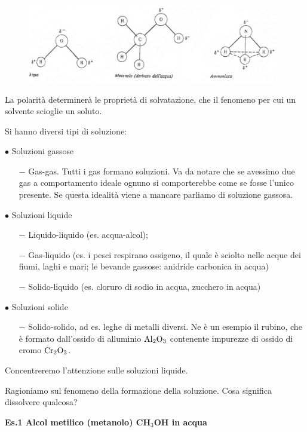 \begin{figure}[htp]
    \centering
    \includegraphics[width=11cm]{immagini/molecole_polari}
\end{figure}

La polarità determinerà le proprietà di solvatazione, che il fenomeno per cui un solvente scioglie un soluto.

\vspace{0.2cm}Si hanno diversi tipi di soluzione:

\vspace{0.2cm}$\bullet$ Soluzioni gassose
\begin{itemize}
    \item[$-$]Gas-gas. Tutti i gas formano soluzioni. Va da notare che se avessimo due gas a comportamento ideale ognuno si comporterebbe come se fosse l'unico presente. Se questa idealità viene a mancare parliamo di soluzione gassosa.
\end{itemize}

$\bullet$ Soluzioni liquide
\begin{itemize}
    \item[$-$]Liquido-liquido (es. acqua-alcol);
    \item[$-$]Gas-liquido (es. i pesci respirano ossigeno, il quale è sciolto nelle acque dei fiumi, laghi e mari; le bevande gassose: anidride carbonica in acqua)
    \item[$-$]Solido-liquido (es. cloruro di sodio in acqua, zucchero in acqua) 
\end{itemize}
\vspace{0.2cm}$\bullet$ Soluzioni solide
\begin{itemize}
    \item[$-$]Solido-solido, ad es. leghe di metalli diversi. Ne è un esempio il rubino, che è formato dall'ossido di alluminio $\rm Al_2O_3$ contenente impurezze di ossido di cromo $\rm Cr_2O_3$.
\end{itemize}
Concentreremo l'attenzione sulle soluzioni liquide.

Ragioniamo sul fenomeno della formazione della soluzione. Cosa significa dissolvere qualcosa?

\vspace{0.2cm}\textbf{Es.1 Alcol metilico (metanolo) CH$_3$OH in acqua}

